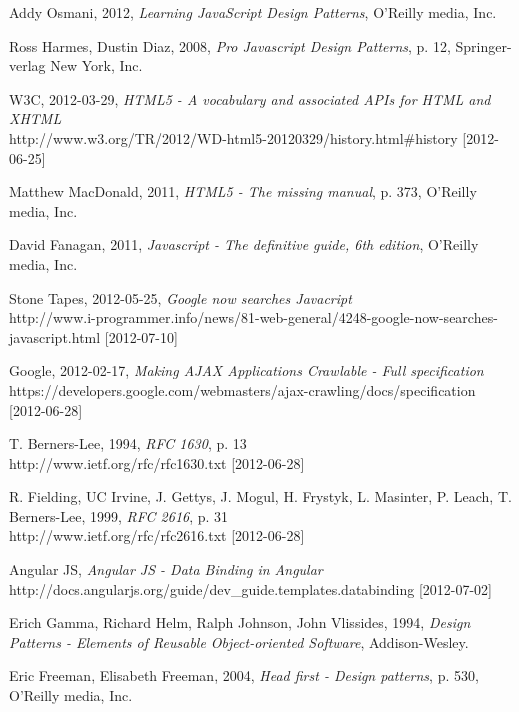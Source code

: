 \begin{thebibliography}{9}
 Addy Osmani, 2012, {\em Learning JavaScript Design Patterns}, O'Reilly media, Inc.

 Ross Harmes, Dustin Diaz, 2008, {\em Pro Javascript Design Patterns}, p. 12,  Springer-verlag New York, Inc.

 W3C, 2012-03-29, {\em HTML5 - A vocabulary and associated APIs for HTML and XHTML}\\http://www.w3.org/TR/2012/WD-html5-20120329/history.html\#history [2012-06-25]

 Matthew MacDonald, 2011, {\em HTML5 - The missing manual}, p. 373, O'Reilly media, Inc.

 David Fanagan, 2011, {\em Javascript - The definitive guide, 6th edition}, O'Reilly media, Inc.

 Stone Tapes, 2012-05-25, {\em Google now searches Javacript}\\http://www.i-programmer.info/news/81-web-general/4248-google-now-searches-javascript.html [2012-07-10]

 Google, 2012-02-17, {\em Making AJAX Applications Crawlable - Full specification}\\https://developers.google.com/webmasters/ajax-crawling/docs/specification [2012-06-28]

 T. Berners-Lee, 1994, {\em RFC 1630}, p. 13\\http://www.ietf.org/rfc/rfc1630.txt [2012-06-28]

 R. Fielding, UC Irvine, J. Gettys, J. Mogul, H. Frystyk, L. Masinter, P. Leach, T. Berners-Lee, 1999, {\em RFC 2616}, p. 31\\http://www.ietf.org/rfc/rfc2616.txt [2012-06-28]

 Angular JS, {\em Angular JS - Data Binding in Angular}\\http://docs.angularjs.org/guide/dev\_guide.templates.databinding [2012-07-02]

 Erich Gamma, Richard Helm, Ralph Johnson, John Vlissides, 1994, {\em Design Patterns - Elements of Reusable Object-oriented Software}, Addison-Wesley.

 Eric Freeman, Elisabeth Freeman, 2004, {\em Head first - Design patterns}, p. 530, O'Reilly media, Inc.


\end{thebibliography}
